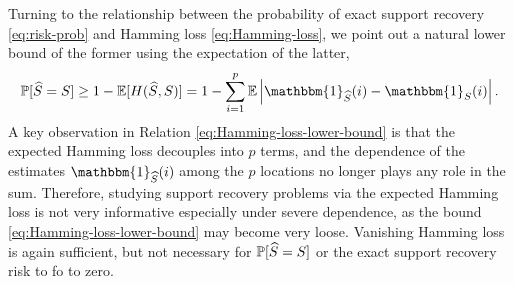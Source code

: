 \medskip

Turning to the relationship between the probability of exact support recovery \eqref{eq:risk-prob} and Hamming loss \eqref{eq:Hamming-loss}, we point out a natural lower bound of the former using the expectation of the latter,
\begin{equation} \label{eq:Hamming-loss-lower-bound}
    \mathbb{P}[\widehat S = S] 
    \ge 1 - \mathbb{E}[H(\widehat S, S)]
    = 1 - \sum\limits_{i=1}^p\E\left|\mathbbm{1}_{\widehat{S}}(i)- \mathbbm{1}_{S}(i)\right|.
\end{equation}
A key observation in Relation \eqref{eq:Hamming-loss-lower-bound} is that the expected Hamming loss decouples into $p$ terms, and the dependence of the estimates $\mathbbm{1}_{\widehat{S}}(i)$ among the $p$ locations no longer plays any role in the sum.
Therefore, studying support recovery problems via the expected Hamming loss is not very informative especially under severe dependence, as the bound \eqref{eq:Hamming-loss-lower-bound} may become {very} loose.
Vanishing Hamming loss is again sufficient, but not necessary for 
$\P[\widehat{S}=S]$ or the exact support recovery risk to fo to zero.

